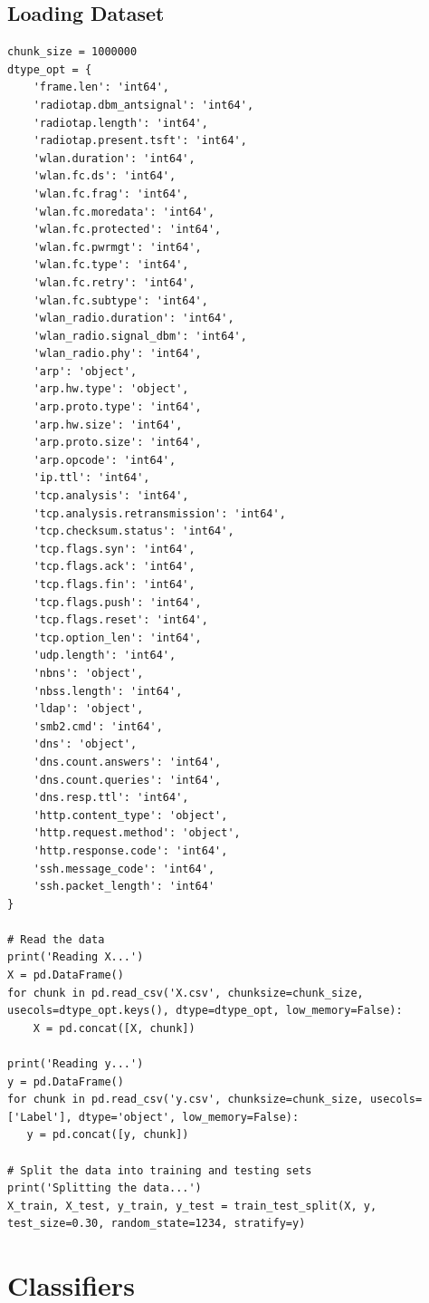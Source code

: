\begin{appendices}
\subsection{Loading Dataset}
\label{appx:Loading Dataset}
\begin{lstlisting}
chunk_size = 1000000
dtype_opt = {
    'frame.len': 'int64',
    'radiotap.dbm_antsignal': 'int64',
    'radiotap.length': 'int64',
    'radiotap.present.tsft': 'int64',
    'wlan.duration': 'int64',
    'wlan.fc.ds': 'int64',
    'wlan.fc.frag': 'int64',
    'wlan.fc.moredata': 'int64',
    'wlan.fc.protected': 'int64',
    'wlan.fc.pwrmgt': 'int64',
    'wlan.fc.type': 'int64',
    'wlan.fc.retry': 'int64',
    'wlan.fc.subtype': 'int64',
    'wlan_radio.duration': 'int64',
    'wlan_radio.signal_dbm': 'int64',
    'wlan_radio.phy': 'int64',
    'arp': 'object',
    'arp.hw.type': 'object',
    'arp.proto.type': 'int64',
    'arp.hw.size': 'int64',
    'arp.proto.size': 'int64',
    'arp.opcode': 'int64',
    'ip.ttl': 'int64',
    'tcp.analysis': 'int64',
    'tcp.analysis.retransmission': 'int64',
    'tcp.checksum.status': 'int64',
    'tcp.flags.syn': 'int64',
    'tcp.flags.ack': 'int64',
    'tcp.flags.fin': 'int64',
    'tcp.flags.push': 'int64',
    'tcp.flags.reset': 'int64',
    'tcp.option_len': 'int64',
    'udp.length': 'int64',
    'nbns': 'object',
    'nbss.length': 'int64',
    'ldap': 'object',
    'smb2.cmd': 'int64',
    'dns': 'object',
    'dns.count.answers': 'int64',
    'dns.count.queries': 'int64',
    'dns.resp.ttl': 'int64',
    'http.content_type': 'object',
    'http.request.method': 'object',
    'http.response.code': 'int64',
    'ssh.message_code': 'int64',
    'ssh.packet_length': 'int64'
}

# Read the data
print('Reading X...')
X = pd.DataFrame()
for chunk in pd.read_csv('X.csv', chunksize=chunk_size, usecols=dtype_opt.keys(), dtype=dtype_opt, low_memory=False):
    X = pd.concat([X, chunk])

print('Reading y...')
y = pd.DataFrame()
for chunk in pd.read_csv('y.csv', chunksize=chunk_size, usecols=['Label'], dtype='object', low_memory=False):
   y = pd.concat([y, chunk])

# Split the data into training and testing sets
print('Splitting the data...')
X_train, X_test, y_train, y_test = train_test_split(X, y, test_size=0.30, random_state=1234, stratify=y)
\end{lstlisting}

\newpage
\section{Classifiers}
\label{appx: Classifiers}


\end{appendices}
